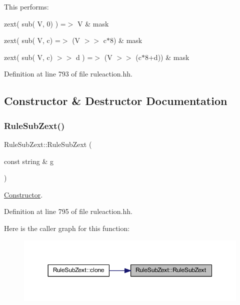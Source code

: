 This performs\+:
\begin{DoxyItemize}
\item {\ttfamily zext( sub( V, 0) ) =$>$ V \& mask}
\item {\ttfamily zext( sub( V, c) =$>$ (V $>$$>$ c$\ast$8) \& mask}
\item {\ttfamily zext( sub( V, c) $>$$>$ d ) =$>$ (V $>$$>$ (c$\ast$8+d)) \& mask} 
\end{DoxyItemize}

Definition at line 793 of file ruleaction.\+hh.



\subsection{Constructor \& Destructor Documentation}
\mbox{\label{class_rule_sub_zext_a5b130dff249f64556339a226598a9e42}} 
\subsubsection{\texorpdfstring{RuleSubZext()}{RuleSubZext()}}
{\footnotesize\ttfamily Rule\+Sub\+Zext\+::\+Rule\+Sub\+Zext (\begin{DoxyParamCaption}\item[{const string \&}]{g }\end{DoxyParamCaption})\hspace{0.3cm}{\ttfamily [inline]}}



\mbox{\hyperlink{class_constructor}{Constructor}}. 



Definition at line 795 of file ruleaction.\+hh.

Here is the caller graph for this function\+:
\nopagebreak
\begin{figure}[H]
\begin{center}
\leavevmode
\includegraphics[width=350pt]{class_rule_sub_zext_a5b130dff249f64556339a226598a9e42_icgraph}
\end{center}
\end{figure}


